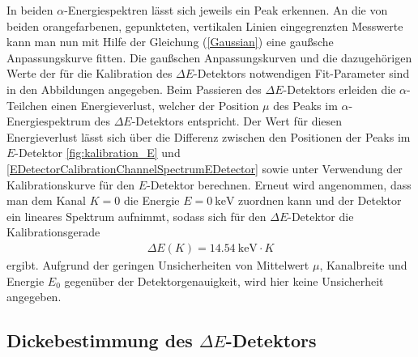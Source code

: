 In beiden $\alpha$-Energiespektren lässt sich jeweils ein Peak erkennen.
An die von beiden orangefarbenen, gepunkteten, vertikalen Linien eingegrenzten Messwerte kann man nun mit Hilfe der Gleichung (\ref{Gaussian}) eine gaußsche Anpassungskurve fitten.
Die gaußschen Anpassungskurven und die dazugehörigen Werte der für die Kalibration des $\Delta E$-Detektors notwendigen Fit-Parameter sind in den Abbildungen angegeben.
Beim Passieren des $\Delta E$-Detektors erleiden die $\alpha$-Teilchen einen Energieverlust, welcher der Position $\mu$ des Peaks im $\alpha$-Energiespektrum des $\Delta E$-Detektors entspricht.
Der Wert für diesen Energieverlust lässt sich über die Differenz zwischen den Positionen der Peaks im $E$-Detektor \cref{fig:kalibration_E} und \cref{EDetectorCalibrationChannelSpectrumEDetector} sowie unter Verwendung der Kalibrationskurve für den $E$-Detektor berechnen.
Erneut wird angenommen, dass man dem Kanal $K=\num{0}$ die Energie $E=\SI{0}{\kilo\electronvolt}$ zuordnen kann und der Detektor ein lineares Spektrum aufnimmt, sodass sich für den $\Delta E$-Detektor die Kalibrationsgerade
\begin{align}
\Delta E(K) = \SI{14,54}{\kilo\electronvolt} \cdot K
\end{align}
ergibt.
Aufgrund der geringen Unsicherheiten von Mittelwert $\mu$, Kanalbreite und Energie $E_0$ gegenüber der Detektorgenauigkeit, wird hier keine Unsicherheit angegeben.

\subsection{Dickebestimmung des $\Delta E$-Detektors} \label{sec:de_kalibration}


